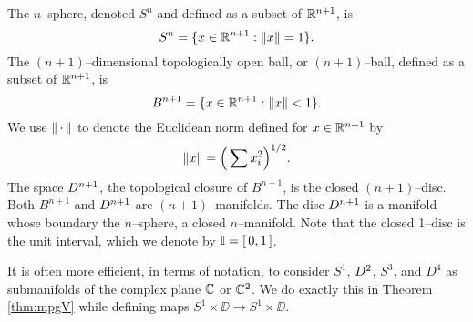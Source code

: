 \begin{ex}
	The $n$--sphere, denoted $S^n$ and defined as a subset of $\mathbb{R}^{n+1}$, is
	\[
	S^n = \{x\in\mathbb{R}^{n+1}:\left\lVert x \right\rVert=1\}.
	\]
	The $(n+1)$--dimensional topologically open ball, or $(n+1)$--ball, defined as a subset of $\mathbb{R}^{n+1}$, is
	\[
	B^{n+1} = \{x\in\mathbb{R}^{n+1}:\left\lVert x \right\rVert< 1\}.
	\]
	We use $\left\lVert \,\cdot\, \right\rVert$ to denote the Euclidean norm defined for $x\in\mathbb{R}^{n+1}$ by
	\[
	\left\lVert x \right\rVert = \Big( \sum x_i^2 \Big)^{1/2}.
	\]
	The space $D^{n+1}$, the topological closure of $B^{n+1}$, is the closed $(n+1)$--disc.
	Both $B^{n+1}$ and $D^{n+1}$ are $(n+1)$--manifolds.
	The disc $D^{n+1}$ is a manifold whose boundary the $n$--sphere, a closed $n$--manifold.
	Note that the closed 1--disc is the unit interval, which we denote by $\mathbb{I}=[\,0,1\,]$.
	
	It is often more efficient, in terms of notation, to consider $S^1$, $D^2$, $S^3$, and $D^4$ as submanifolds of the complex plane $\mathbb{C}$ or $\mathbb{C}^2$.
	We do exactly this in Theorem \ref{thm:mpgV} while defining maps $S^1\times\DD\to S^1\times\DD$.
\end{ex}

